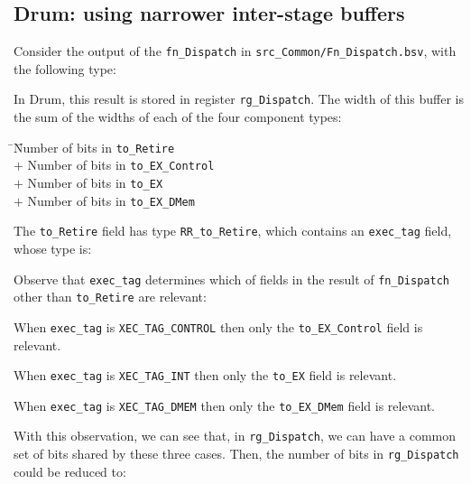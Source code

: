 
\subsection{Drum: using narrower inter-stage buffers}

Consider the output of the \verb|fn_Dispatch| in
\verb|src_Common/Fn_Dispatch.bsv|, with the following type:


In Drum, this result is stored in register \verb|rg_Dispatch|.  The
width of this buffer is the sum of the widths of each of the four
component types:

\begin{tabbing}
\hmm \= \hmm \= Number of bits in {\tt to\_Retire} \\
     \> $+$  \> Number of bits in {\tt to\_EX\_Control} \\
     \> $+$  \> Number of bits in {\tt to\_EX} \\
     \> $+$  \> Number of bits in {\tt to\_EX\_DMem}
\end{tabbing}

The \verb|to_Retire| field has type \verb|RR_to_Retire|, which
contains an \verb|exec_tag| field, whose type is:


Observe that \verb|exec_tag| determines which of fields in the result
of \verb|fn_Dispatch| other than \verb|to_Retire| are relevant:

\begin{tightlist}

 \item When \verb|exec_tag| is \verb|XEC_TAG_CONTROL| then
       only the \verb|to_EX_Control| field is relevant.

 \item When \verb|exec_tag| is \verb|XEC_TAG_INT| then
       only the \verb|to_EX| field is relevant.

 \item When \verb|exec_tag| is \verb|XEC_TAG_DMEM| then
       only the \verb|to_EX_DMem| field is relevant.

\end{tightlist}

With this observation, we can see that, in \verb|rg_Dispatch|, we can
have a common set of bits shared by these three cases.  Then, the
number of bits in \verb|rg_Dispatch| could be reduced to:

